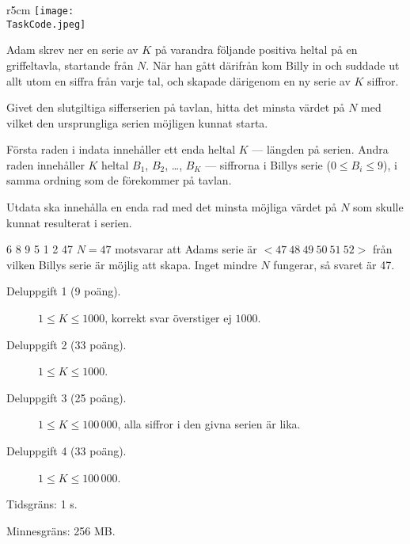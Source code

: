 \documentclass{boi2014-se}
\renewcommand{\TaskCode}{sequence}
\begin{document}
    \begin{wrapfigure}[5]{r}{5cm}
        \vspace{-24pt}
		\texttt{[image: \\TaskCode.jpeg]}
	\end{wrapfigure}

    Adam skrev ner en serie av $K$ på varandra följande positiva heltal på en
    griffeltavla, startande från $N$.
    När han gått därifrån kom Billy in och suddade ut allt utom en siffra
    från varje tal, och skapade därigenom en ny serie av $K$ siffror.

    \Task

    Givet den slutgiltiga sifferserien på tavlan, hitta det minsta värdet på $N$
    med vilket den ursprungliga serien möjligen kunnat starta.

    \Input

    Första raden i indata innehåller ett enda heltal $K$ --- längden på serien.
    Andra raden innehåller $K$ heltal $B_1$, $B_2$, \dots, $B_K$ --- siffrorna
    i Billys serie ($0 \le B_i \le 9$), i samma ordning som de förekommer på tavlan.

    \Output

    Utdata ska innehålla en enda rad med det minsta möjliga värdet på $N$ som
    skulle kunnat resulterat i serien.

    \Example

    \example
    {
        6 8 9 5 1 2
    }
    {
        47
    }
    {
        $N = 47$ motsvarar att Adams serie är
        $<47\ 48\ 49\ 50\ 51\ 52>$ från vilken Billys serie är möjlig att skapa.
        Inget mindre $N$ fungerar, så svaret är 47.
    }

\Scoring

\begin{description}
    \item[Deluppgift 1 (9 poäng).] $1 \le K \le 1000$, korrekt
        svar överstiger ej $1000$.
    \item[Deluppgift 2 (33 poäng).] $1 \le K \le 1000$.
    \item[Deluppgift 3 (25 poäng).] $1 \le K \le 100\,000$, alla
        siffror i den givna serien är lika.
    \item[Deluppgift 4 (33 poäng).] $1 \le K \le 100\,000$.
\end{description}

\Constraints

Tidsgräns: 1 s.

Minnesgräns: 256 MB.
\end{document}
